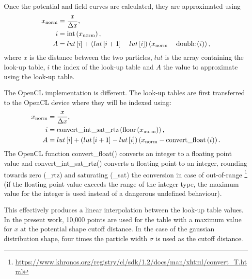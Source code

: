 Once the potential and field curves are calculated, they are approximated using
\begin{align}
x_{\textrm{norm}} & = \frac{x}{\Delta x}, \\
i   & = \textrm{int}\left( x_{\textrm{norm}} \right), \\
A   &= lut\left[ i \right] + \left( lut\left[ i+1 \right]-lut\left[ i \right] \right) \left( x_{\textrm{norm}}-\textrm{double}\left( i \right) \right),
\end{align}
where $x$ is the distance between the two particles, $lut$ is the array
containing the look-up table, $i$ the index of the look-up table and $A$ the
value to approximate using the look-up table.

The OpenCL implementation is different. The look-up tables are first transferred
to the OpenCL device where they will be indexed using:
\begin{align}
x_{\textrm{norm}} & = \frac{x}{\Delta x}, \\
i   & = \textrm{convert\_int\_sat\_rtz}\left( \textrm{floor}\left( x_{\textrm{norm}} \right) \right), \\
A   &= lut\left[ i \right] + \left( lut\left[ i+1 \right]-lut\left[ i \right] \right) \left( x_{\textrm{norm}}-\textrm{convert\_float}\left( i \right) \right).
\end{align}
The OpenCL function
convert\_float() converts an integer to a floating point value
and convert\_int\_sat\_rtz() converts a floating point to an integer,
rounding towards zero (\_rtz) and saturating (\_sat) the conversion in case of
out-of-range
\footnote{\url{https://www.khronos.org/registry/cl/sdk/1.2/docs/man/xhtml/convert_T.html}}
(if the floating point value exceeds the range of the integer type,
the maximum value for the integer is used instead of a dangerous undefined
behaviour).

This effectively produces a linear interpolation between the look-up table values.
In the present work, 10,000 points are used for the table with a maximum value
for $x$ at the potential shape cutoff distance. In the case of the gaussian
distribution shape, four times the particle width $\sigma$ is used as the cutoff
distance.

